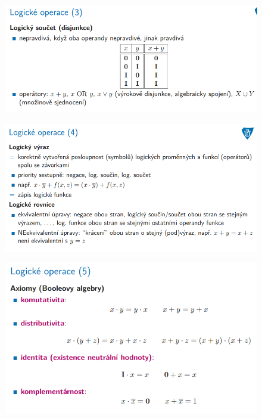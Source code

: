 \documentclass[10pt,a4paper]{article}
\begin{document}
\begin{figure} [h]
	\includegraphics[scale=0.65]{img/prvni_odstavec/otazka2/logicke_operace3.png}	
\end{figure}

\begin{figure} [h]
	\includegraphics[scale=0.65]{img/prvni_odstavec/otazka2/logicke_operace4.png}	
\end{figure}

\begin{figure} [h]
	\includegraphics[scale=0.65]{img/prvni_odstavec/otazka2/logicke_operace5.png}	
\end{figure}
\end{document}
